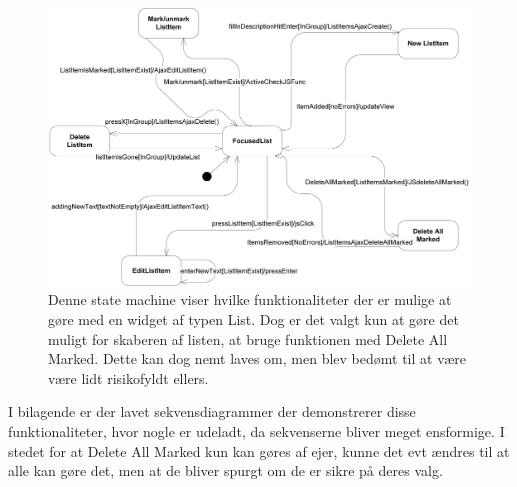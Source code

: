 \begin{figure}[H]
    \includegraphics[width=\linewidth]{09_Arkitektur/Lists/Images/List_SM.png}
    \caption{Denne state machine viser hvilke funktionaliteter der er mulige at gøre med en widget af typen List. Dog er det valgt kun at gøre det muligt for skaberen af listen, at bruge funktionen med Delete All Marked. Dette kan dog nemt laves om, men blev bedømt til at være være lidt risikofyldt ellers.}
    \label{fig:list_stm}
\end{figure}

I bilagende er der lavet sekvensdiagrammer der demonstrerer disse funktionaliteter, hvor nogle er udeladt, da sekvenserne bliver meget ensformige. I stedet for at Delete All Marked kun kan gøres af ejer, kunne det evt ændres til at alle kan gøre det, men at de bliver spurgt om de er sikre på deres valg.